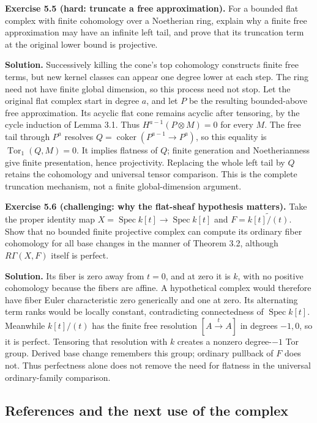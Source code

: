 \documentclass[11pt]{article}
\begin{document}
\textbf{Exercise 5.5 (hard: truncate a free approximation).} For a
bounded flat complex with finite cohomology over a Noetherian ring,
explain why a finite free approximation may have an infinite left tail,
and prove that its truncation term at the original lower bound is
projective.

\textbf{Solution.} Successively killing the cone's top cohomology
constructs finite free terms, but new kernel classes can appear one
degree lower at each step. The ring need not have finite global
dimension, so this process need not stop. Let the original flat complex
start in degree \(a\), and let \(P\) be the resulting bounded-above free
approximation. Its acyclic flat cone remains acyclic after tensoring, by
the cycle induction of Lemma 3.1. Thus \(H^{a-1}(P\otimes M)=0\) for
every \(M\). The free tail through \(P^a\) resolves
\(Q=\operatorname{coker}(P^{a-1}\to P^a)\), so this equality is
\(\operatorname{Tor}_1(Q,M)=0\). It implies flatness of \(Q\); finite
generation and Noetherianness give finite presentation, hence
projectivity. Replacing the whole left tail by \(Q\) retains the
cohomology and universal tensor comparison. This is the complete
truncation mechanism, not a finite global-dimension argument.

\textbf{Exercise 5.6 (challenging: why the flat-sheaf hypothesis
matters).} Take the proper identity map
\(X=\operatorname{Spec}k[t]\to\operatorname{Spec}k[t]\) and
\(F=\widetilde{k[t]/(t)}\). Show that no bounded finite projective
complex can compute its ordinary fiber cohomology for all base changes
in the manner of Theorem 3.2, although \(R\Gamma(X,F)\) itself is
perfect.

\textbf{Solution.} Its fiber is zero away from \(t=0\), and at zero it
is \(k\), with no positive cohomology because the fibers are affine. A
hypothetical complex would therefore have fiber Euler characteristic
zero generically and one at zero. Its alternating term ranks would be
locally constant, contradicting connectedness of
\(\operatorname{Spec}k[t]\). Meanwhile \(k[t]/(t)\) has the finite free
resolution \([A\xrightarrow{t}A]\) in degrees \(-1,0\), so it is
perfect. Tensoring that resolution with \(k\) creates a nonzero
degree-\(-1\) Tor group. Derived base change remembers this group;
ordinary pullback of \(F\) does not. Thus perfectness alone does not
remove the need for flatness in the universal ordinary-family
comparison.

\subsection{References and the next use of the
complex}\label{references-and-the-next-use-of-the-complex}
\end{document}
